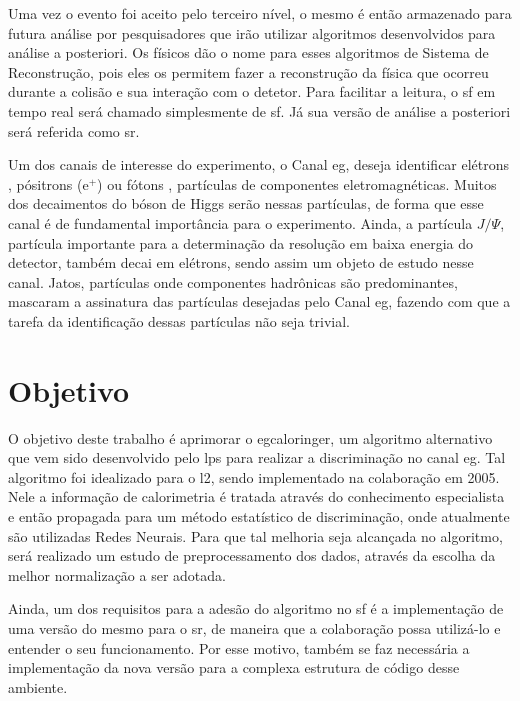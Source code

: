 Uma vez o evento foi aceito pelo terceiro nível, o mesmo é então armazenado
para futura análise por pesquisadores que irão utilizar algoritmos desenvolvidos 
para análise a posteriori. Os físicos dão o nome para esses algoritmos de Sistema de
Reconstrução, pois eles os permitem fazer a reconstrução da física que ocorreu
durante a colisão e sua interação com o detetor. Para facilitar a leitura, o
\glsdesc{sf} em tempo real será chamado simplesmente de \glsdesc{sf}.
Já sua versão de análise a posteriori será referida como \glsdesc{sr}.

Um dos canais de interesse do experimento, o Canal \acrshort{eg},
deseja identificar elétrons , pósitrons (e$^+$)
ou fótons , 
partículas de componentes eletromagnéticas. Muitos dos decaimentos do bóson de
Higgs serão nessas partículas, de forma que esse canal é de fundamental
importância para o experimento. Ainda, a partícula $J/\Psi$, partícula importante
para a determinação da resolução em baixa energia do detector, 
também decai em elétrons, sendo assim um objeto de estudo nesse canal.
Jatos, partículas onde componentes hadrônicas são predominantes, 
mascaram a assinatura das partículas desejadas pelo Canal \acrshort{eg}, fazendo 
com que a tarefa da identificação dessas partículas não seja trivial.

\section{Objetivo} %

O objetivo deste trabalho é aprimorar o \gls{egcaloringer},
um algoritmo alternativo que vem sido desenvolvido pelo \gls{lps}
para realizar a discriminação 
no canal \acrshort{eg}. Tal algoritmo foi idealizado para o \gls{l2}, 
sendo implementado na colaboração em 2005.
Nele a informação de calorimetria é tratada através do conhecimento especialista
e então propagada para um método estatístico 
de discriminação, onde atualmente são utilizadas Redes Neurais. 
Para que tal melhoria seja alcançada no
algoritmo, será realizado um estudo de preprocessamento dos dados,
através da escolha da melhor normalização a ser adotada.

Ainda, um dos requisitos para a adesão do algoritmo no \glsdesc{sf} é a
implementação de uma versão do mesmo para o \glsdesc{sr},
de maneira  que a colaboração possa utilizá-lo e entender o seu
funcionamento. Por esse motivo, também se faz necessária a implementação 
da nova versão para a complexa estrutura de código desse ambiente.

